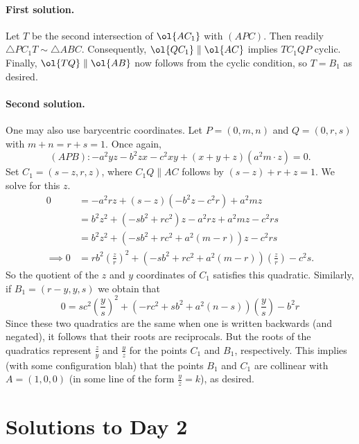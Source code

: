 \documentclass[11pt]{scrartcl}
\begin{document}
\paragraph{First solution.}
Let $T$ be the second intersection of $\ol{AC_1}$
with $(APC)$.
Then readily $\triangle PC_1T \sim \triangle ABC$.
Consequently, $\ol{QC_1} \parallel \ol{AC}$ implies $TC_1QP$ cyclic.
Finally, $\ol{TQ} \parallel \ol{AB}$ now
follows from the cyclic condition,
so $T = B_1$ as desired.

\paragraph{Second solution.}
One may also use barycentric coordinates.
Let $P = (0,m,n)$ and $Q = (0,r,s)$ with $m+n=r+s=1$.  Once again, \[ (APB) : -a^2yz-b^2zx-c^2xy + (x+y+z)(a^2m \cdot z) = 0.
\] Set $C_1 = (s-z, r, z)$, where $C_1Q \parallel AC$ follows by $(s-z) + r + z = 1$.  We solve for this $z$.
\begin{align*}
0 &= -a^2rz + (s-z)(-b^2z-c^2r) + a^2mz \\
&= b^2z^2 + (-sb^2+rc^2)z - a^2rz + a^2mz - c^2rs \\
&= b^2z^2 + (-sb^2+rc^2+a^2(m-r))z - c^2rs \\
\implies 0 &= rb^2 \left( \frac{z}{r} \right)^2 + (-sb^2+rc^2 + a^2(m-r)) \left(\frac{z}{r}\right) - c^2s.
\end{align*}
So the quotient of the $z$ and $y$ coordinates of $C_1$ satisfies this quadratic.  Similarly, if $B_1 = (r-y, y, s)$ we obtain that
\[
0 = sc^2 \left( \frac{y}{s} \right)^2 + (-rc^2 + sb^2 + a^2(n-s)) \left(\frac{y}{s}\right) - b^2r
\]
Since these two quadratics are the same when one is written backwards (and negated), it follows that their roots are reciprocals.  But the roots of the quadratics represent $\tfrac{z}{y}$ and $\tfrac{y}{z}$ for the points $C_1$ and $B_1$, respectively.  This implies (with some configuration blah) that the points $B_1$ and $C_1$ are collinear with $A=(1,0,0)$ (in some line of the form $\tfrac{y}{z} = k$), as desired.
\pagebreak

\section{Solutions to Day 2}
\end{document}
